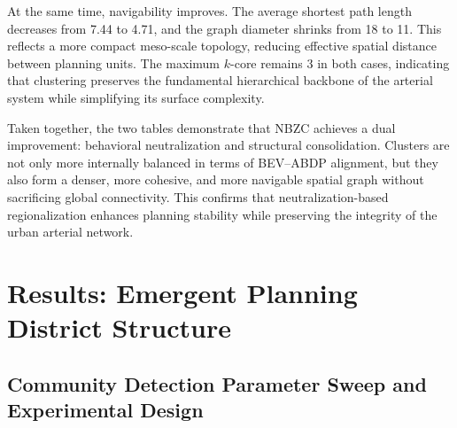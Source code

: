 \documentclass[conference]{IEEEtran}
\begin{document}
At the same time, navigability improves. The average shortest path
length decreases from 7.44 to 4.71, and the graph diameter shrinks
from 18 to 11. This reflects a more compact meso-scale topology,
reducing effective spatial distance between planning units. The
maximum $k$-core remains 3 in both cases, indicating that clustering
preserves the fundamental hierarchical backbone of the arterial system
while simplifying its surface complexity.

Taken together, the two tables demonstrate that NBZC achieves a dual
improvement: behavioral neutralization and structural consolidation.
Clusters are not only more internally balanced in terms of BEV–ABDP
alignment, but they also form a denser, more cohesive, and more
navigable spatial graph without sacrificing global connectivity.
This confirms that neutralization-based regionalization enhances
planning stability while preserving the integrity of the urban
arterial network.

\section{Results: Emergent Planning District Structure}
\subsection{Community Detection Parameter Sweep and Experimental Design}
\end{document}
